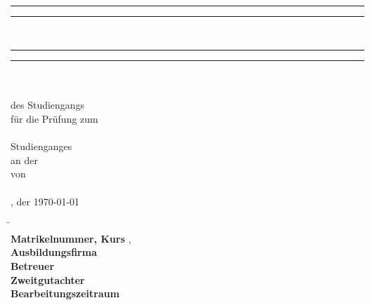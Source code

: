 \begin{titlepage}
	\thispagestyle{empty}
    \begin{center}
        \vspace{1cm}
        \\
        \rule{\textwidth}{1.6pt}\vspace*{-\baselineskip}\vspace*{2pt}
        \rule{\textwidth}{0.4pt}
        \\[0.2\baselineskip]
        {\LARGE \myTitle}
        \rule{\textwidth}{0.4pt}\vspace*{-\baselineskip}\vspace{3.2pt}
        \rule{\textwidth}{1.6pt}
        \\
        \vspace*{12mm}	{\large \myDokumententyp}\\
        \ifx\myBachelorart\undefinde
            \vspace*{27mm}	des Studiengangs \myStudiengang\\
        \else
            \vspace*{12mm}	für die Prüfung zum\\
            \vspace*{3mm} 	{\large \myBachelorart}\\
            \vspace*{12mm}	Studienganges \myStudiengang\\
        \fi
        \vspace*{3mm} 	an der \myHochschule\\
        \vspace*{12mm}	von\\
        \vspace*{3mm} 	{\large \myStudentenname}\\
        \vspace*{12mm}	{\todaysname}, der {\today} \\
      \end{center}

      \vfill
      \begin{spacing}{1.2}
        \centering
        \begin{tabbing}
            \hspace{6.5cm}                   \= \kill\\
            \textbf{Matrikelnummer, Kurs}  \>  \myMatrikelnummer, \myKurs\\
            \textbf{Ausbildungsfirma}      \>  \myAusbildungsfirma\\
            \textbf{Betreuer}         \>  \myErstgutachter\\
            \ifx\myZweigutachter\undefined
            \else
            \textbf{Zweitgutachter}        \>  \myZweigutachter\\
            \fi
            \textbf{Bearbeitungszeitraum}  \>  \Bearbeitungszeitraum\\
        \end{tabbing}
      \end{spacing}
\end{titlepage}